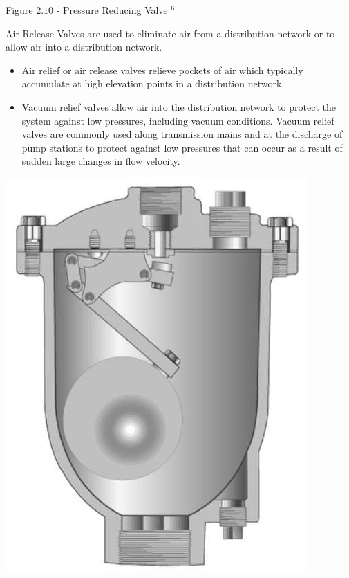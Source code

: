 \documentclass[10pt]{article}
\begin{document}
Figure $2.10$ - Pressure Reducing Valve ${ }^{6}$

Air Release Valves are used to eliminate air from a distribution network or to allow air into a distribution network.

\begin{itemize}
  \item Air relief or air release valves relieve pockets of air which typically accumulate at high elevation points in a distribution network.

  \item Vacuum relief valves allow air into the distribution network to protect the system against low pressures, including vacuum conditions. Vacuum relief valves are commonly used along transmission mains and at the discharge of pump stations to protect against low pressures that can occur as a result of sudden large changes in flow velocity.

\end{itemize}
\includegraphics[max width=\textwidth]{AirReleaseValve}
\end{document}
